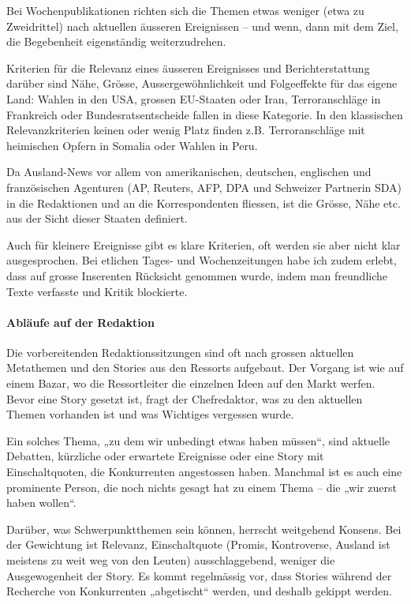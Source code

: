 Bei Wochenpublikationen richten sich die Themen etwas weniger (etwa zu
Zweidrittel) nach aktuellen äusseren Ereignissen -- und wenn, dann mit
dem Ziel, die Begebenheit eigenständig weiterzudrehen.

Kriterien für die Relevanz eines äusseren Ereignisses und
Berichterstattung darüber sind Nähe, Grösse, Aussergewöhnlichkeit und
Folgeeffekte für das eigene Land: Wahlen in den USA, grossen EU-Staaten
oder Iran, Terroranschläge in Frankreich oder Bundesratsentscheide
fallen in diese Kategorie. In den klassischen Relevanzkriterien keinen
oder wenig Platz finden z.B. Terroranschläge mit heimischen Opfern in
Somalia oder Wahlen in Peru.

Da Ausland-News vor allem von amerikanischen, deutschen, englischen und
französischen Agenturen (AP, Reuters, AFP, DPA und Schweizer Partnerin
SDA) in die Redaktionen und an die Korrespondenten fliessen, ist die
Grösse, Nähe etc. aus der Sicht dieser Staaten definiert.

Auch für kleinere Ereignisse gibt es klare Kriterien, oft werden sie
aber nicht klar ausgesprochen. Bei etlichen Tages- und Wochenzeitungen
habe ich zudem erlebt, dass auf grosse Inserenten Rücksicht genommen
wurde, indem man freundliche Texte verfasste und Kritik blockierte.

\hypertarget{abluxe4ufe-auf-der-redaktion}{%
\paragraph{Abläufe auf der
Redaktion}\label{abluxe4ufe-auf-der-redaktion}}

Die vorbereitenden Redaktionssitzungen sind oft nach grossen aktuellen
Metathemen und den Stories aus den Ressorts aufgebaut. Der Vorgang ist
wie auf einem Bazar, wo die Ressortleiter die einzelnen Ideen auf den
Markt werfen. Bevor eine Story gesetzt ist, fragt der Chefredaktor, was
zu den aktuellen Themen vorhanden ist und was Wichtiges vergessen wurde.

Ein solches Thema, „zu dem wir unbedingt etwas haben müssen``, sind
aktuelle Debatten, kürzliche oder erwartete Ereignisse oder eine Story
mit Einschaltquoten, die Konkurrenten angestossen haben. Manchmal ist es
auch eine prominente Person, die noch nichts gesagt hat zu einem Thema
-- die „wir zuerst haben wollen``.

Darüber, was Schwerpunktthemen sein können, herrscht weitgehend Konsens.
Bei der Gewichtung ist Relevanz, Einschaltquote (Promis, Kontroverse,
Ausland ist meistens zu weit weg von den Leuten) ausschlaggebend,
weniger die Ausgewogenheit der Story. Es kommt regelmässig vor, dass
Stories während der Recherche von Konkurrenten „abgetischt`` werden, und
deshalb gekippt werden.

